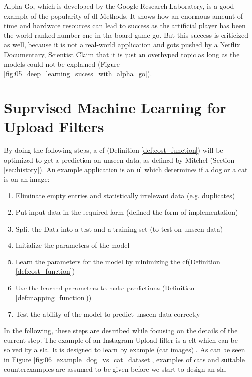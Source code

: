 Alpha Go, which is developed by the Google Research Laboratory, is a good example of the popularity of \gls{dl} Methods. It shows how an enormous amount of time and hardware resources can lead to success as the artificial player has been the world ranked number one in the board game go. But this success is criticized as well, because it is not a real-world application and gots pushed by a Netflix Documentary, Scientist Claim that it is just an overhyped topic as long as the models could not be explained (Figure \ref{fig:05_deep_learning_sucess_with_alpha_go}).

\section{Suprvised Machine Learning for Upload Filters}
\label{sec:supervised_learning}
By doing the following steps, a \Gls{cf} (Definition \ref{def:cost_function}) will be optimized to get a prediction on unseen data, as defined by Mitchel (Section \ref{sec:history}). An example application is an \gls{ul} which determines if a dog or a cat is on an image:

\begin{enumerate}
	\itemsep-0.8em 
	\item Eliminate empty entries and statistically irrelevant data (e.g. duplicates) 
	\item Put input data in the required form (defined the form of implementation)
	\item Split the Data into a test and a training set (to test on unseen data)
	\item Initialize the parameters of the model
	\item Learn the parameters for the model by minimizing the \gls{cf}(Definition \ref{def:cost_function})
	\item Use the learned parameters to make predictions (Definition \ref{def:mapping_function}))
	\item Test the ability of the model to predict unseen data correctly
\end{enumerate}

In the following, these steps are described while focusing on the details of the current step. The example of an Instagram Upload filter is a \Gls{clt} which can be solved by a \Gls{sla}. It is designed to learn by example (cat images) \cite[p. 3 - 4]{Murphy2012}. As can be seen in Figure \ref{fig:06_example_dog_vs_cat_dataset}, examples of cats and suitable counterexamples are assumed to be given before we start to design an \Gls{sla}.\\\\

